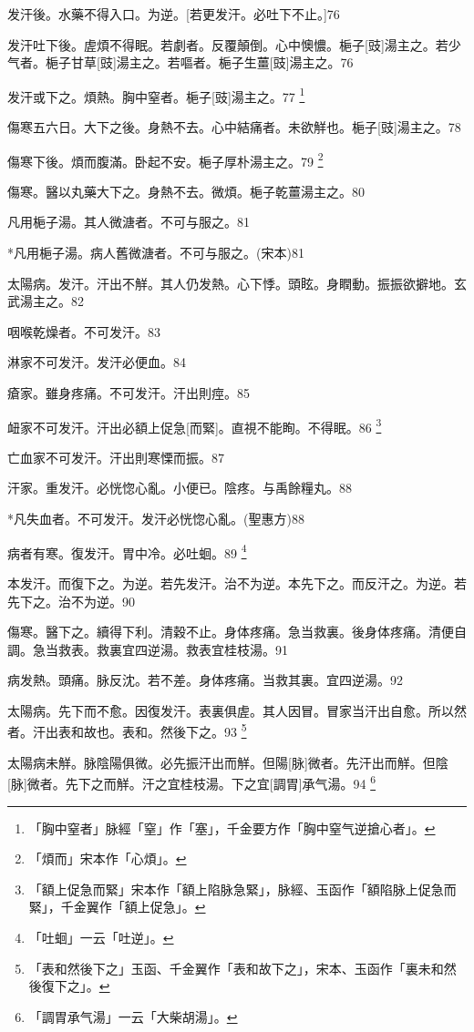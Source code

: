 \documentclass[12pt,twoside,UTF8,b5paper]{ctexbook}
\begin{document}
发汗後。水藥不得入口。为逆。[若更发汗。必吐下不止。]76

发汗吐下後。虗煩不得眠。若劇者。反覆顛倒。心中懊憹。梔子[豉]湯主之。若少气者。梔子甘草[豉]湯主之。若嘔者。梔子生薑[豉]湯主之。76

发汗或下之。煩熱。胸中窒者。梔子[豉]湯主之。77
	\footnote{「胸中窒者」脉經「窒」作「塞」，千金要方作「胸中窒气逆搶心者」。}

傷寒五六日。大下之後。身熱不去。心中結痛者。未欲觧也。梔子[豉]湯主之。78

傷寒下後。煩而腹滿。卧起不安。梔子厚朴湯主之。79
	\footnote{「煩而」宋本作「心煩」。}

傷寒。醫以丸藥大下之。身熱不去。微煩。梔子乾薑湯主之。80

凡用梔子湯。其人微溏者。不可与服之。81

*凡用梔子湯。病人舊微溏者。不可与服之。(宋本)81

太陽病。发汗。汗出不觧。其人仍发熱。心下悸。頭眩。身瞤動。振振欲擗地。玄武湯主之。82

咽喉乾燥者。不可发汗。83

淋家不可发汗。发汗必便血。84

瘡家。雖身疼痛。不可发汗。汗出則痙。85

衄家不可发汗。汗出必額上促急[而緊]。直視不能眴。不得眠。86
	\footnote{「額上促急而緊」宋本作「額上陷脉急緊」，脉經、玉函作「額陷脉上促急而緊」，千金翼作「額上促急」。}

亡血家不可发汗。汗出則寒慄而振。87

汗家。重发汗。必恍惚心亂。小便已。陰疼。与禹餘糧丸。88

*凡失血者。不可发汗。发汗必恍惚心亂。(聖惠方)88

病者有寒。復发汗。胃中冷。必吐蛔。89
	\footnote{「吐蛔」一云「吐逆」。}

本发汗。而復下之。为逆。若先发汗。治不为逆。本先下之。而反汗之。为逆。若先下之。治不为逆。90

傷寒。醫下之。續得下利。清穀不止。身体疼痛。急当救裏。後身体疼痛。清便自調。急当救表。救裏宜四逆湯。救表宜桂枝湯。91

病发熱。頭痛。脉反沈。若不差。身体疼痛。当救其裏。宜四逆湯。92

太陽病。先下而不愈。因復发汗。表裏俱虗。其人因冒。冒家当汗出自愈。所以然者。汗出表和故也。表和。然後下之。93
	\footnote{「表和然後下之」玉函、千金翼作「表和故下之」，宋本、玉函作「裏未和然後復下之」。}

太陽病未觧。脉陰陽俱微。必先振汗出而觧。但陽[脉]微者。先汗出而觧。但陰[脉]微者。先下之而觧。汗之宜桂枝湯。下之宜[調胃]承气湯。94
	\footnote{「調胃承气湯」一云「大柴胡湯」。}
\end{document}

